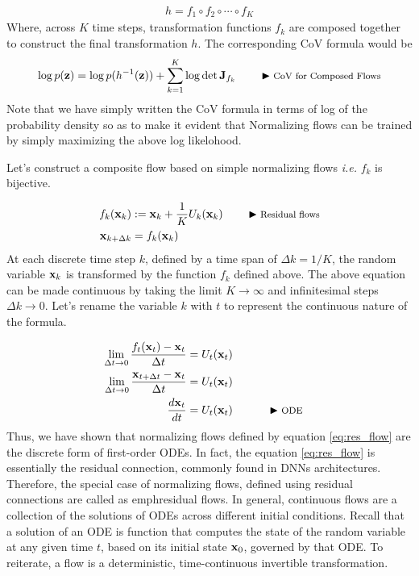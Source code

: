 \documentclass[a4paper, 11pt]{article}
\begin{document}
\begin{align}
    h = f_1 \circ f_2 \circ  \cdots \circ f_K
\end{align}
Where, across $K$ time steps, transformation functions $f_k$ are composed together to construct the final transformation $h$. The corresponding CoV formula would be
\begin{align}
\log p(\mbox{$\mbox{$\mathbf{z}$}$}) = \log p(h^{-1}(\mbox{$\mbox{$\mathbf{z}$}$})) + \sum_{k=1}^K \log \det \mbox{$\mbox{$\mathbf{J}$}$}_{f_k} \qquad \blacktriangleright\text{\footnotesize CoV for Composed Flows} \label{eq:cov-loglik}
\end{align}
Note that we have simply written the CoV formula in terms of log of the probability density so as to make it evident that Normalizing flows can be trained by simply maximizing the above log likelohood.

Let's construct a composite flow based on simple normalizing flows \textit{i.e.} $f_k$ is bijective.

\begin{align}\label{eq:res_flow}
    f_k(\mbox{$\mbox{$\mathbf{x}$}$}_k) &:= \mbox{$\mbox{$\mathbf{x}$}$}_k + \frac{1}{K}U_k(\mbox{$\mbox{$\mathbf{x}$}$}_k) \qquad \blacktriangleright\text{\footnotesize Residual flows}\\
    \mbox{$\mbox{$\mathbf{x}$}$}_{k + \Delta k} &= f_k(\mbox{$\mbox{$\mathbf{x}$}$}_k)
\end{align}
At each discrete time step $k$, defined by a time span of $\Delta k = 1/K$, the random variable $\mbox{$\mbox{$\mathbf{x}$}$}_k$ is transformed by the function $f_k$ defined above. The above equation can be made continuous by taking the limit $K \to \infty$ and infinitesimal steps $\Delta k \to 0$. Let's rename the variable $k$ with $t$ to represent the continuous nature of the formula.

\begin{align}\label{eq:flow_ode}
    \lim_{\Delta t \to 0} \frac{f_t(\mbox{$\mbox{$\mathbf{x}$}$}_t) - \mbox{$\mbox{$\mathbf{x}$}$}_t}{\Delta t} &= U_t(\mbox{$\mbox{$\mathbf{x}$}$}_t)\\
    \lim_{\Delta t \to 0} \frac{ \mbox{$\mbox{$\mathbf{x}$}$}_{t + \Delta t} - \mbox{$\mbox{$\mathbf{x}$}$}_t}{\Delta t} &= U_t(\mbox{$\mbox{$\mathbf{x}$}$}_t) \\ 
    \frac{d \mbox{$\mbox{$\mathbf{x}$}$}_t}{dt} &= U_t(\mbox{$\mbox{$\mathbf{x}$}$}_t) && \qquad \blacktriangleright\text{\footnotesize ODE}
\end{align}
Thus, we have shown that normalizing flows defined by equation \eqref{eq:res_flow} are the discrete form of first-order ODEs. In fact, the equation \eqref{eq:res_flow} is essentially the residual connection, commonly found in DNNs architectures. Therefore, the special case of normalizing flows, defined using residual connections are called as emph{residual flows}. In general, continuous flows are a collection of the solutions of ODEs across different initial conditions. Recall that a solution of an ODE is function that computes the state of the random variable at any given time $t$, based on its initial state $\mbox{$\mbox{$\mathbf{x}$}$}_0$, governed by that ODE. To reiterate, a flow is a deterministic, time-continuous invertible transformation.
   
\end{document}
